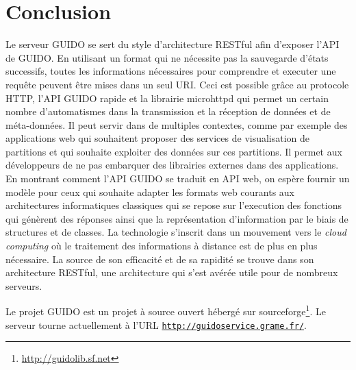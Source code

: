 \documentclass{article}
\newcommand{\footurl}[1]	{\footnote{\url{#1}}}
\newcommand{\icode}[1]		{{\small \texttt{#1}}}
\begin{document}
\section{Conclusion}
Le serveur GUIDO se sert du style d'architecture RESTful afin d'exposer l'API de GUIDO. En utilisant un format qui ne nécessite pas la sauvegarde d'états successifs, toutes les informations nécessaires pour comprendre et executer une requête peuvent être mises dans un seul URI.  Ceci est possible grâce au protocole HTTP, l'API GUIDO rapide et la librairie microhttpd qui permet un certain nombre d'automatismes dans la transmission et la réception de données et de méta-données. Il peut servir dans de multiples contextes, comme par exemple des applications web qui souhaitent proposer des services de visualisation de partitions et qui souhaite exploiter des données sur ces partitions. Il permet aux développeurs de ne pas embarquer des librairies externes dans des applications. En montrant comment l'API GUIDO se traduit en API web, on espère fournir un modèle pour ceux qui souhaite adapter les formats web courants aux architectures informatiques classiques qui se repose sur l'execution des fonctions qui génèrent des réponses ainsi que la représentation d'information par le biais de structures et de classes. La technologie s'inscrit dans un mouvement vers le \emph{cloud computing} où le traitement des informations à distance est de plus en plus nécessaire. La source de son efficacité et de sa rapidité se trouve dans son architecture RESTful, une architecture qui s'est avérée utile pour de nombreux serveurs.\par
Le projet GUIDO est un projet à source ouvert hébergé sur sourceforge\footurl{http://guidolib.sf.net}. Le serveur tourne actuellement à l'URL \icode{\url{http://guidoservice.grame.fr/}}.

\end{document}

